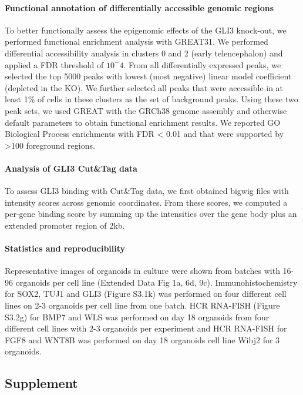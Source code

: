 \paragraph{Functional annotation of differentially accessible genomic regions}
To better functionally assess the epigenomic effects of the GLI3 knock-out, we performed functional enrichment analysis with GREAT31. We performed differential accessibility analysis in clusters 0 and 2 (early telencephalon) and applied a FDR threshold of $10^-4$. From all differentially expressed peaks, we selected the top 5000 peaks with lowest (most negative) linear model coefficient (depleted in the KO). We further selected all peaks that were accessible in at least 1\% of cells in these clusters as the set of background peaks. Using these two peak sets, we used GREAT with the GRCh38 genome assembly and otherwise default parameters to obtain functional enrichment results. We reported GO Biological Process enrichments with FDR < 0.01 and that were supported by >100 foreground regions.
 
\paragraph{Analysis of GLI3 Cut\&Tag data}
To assess GLI3 binding with Cut\&Tag data, we first obtained bigwig files with intensity scores across genomic coordinates. From these scores, we computed a per-gene binding score by summing up the intensities over the gene body plus an extended promoter region of 2kb.
 
\paragraph{Statistics and reproducibility}
Representative images of organoids in culture were shown from batches with 16-96 organoids per cell line (Extended Data Fig 1a, 6d, 9c). Immunohistochemistry for SOX2, TUJ1 and GLI3 (Figure S3.1k) was performed on four different cell lines on 2-3 organoids per cell line from one batch. HCR RNA-FISH (Figure S3.2g) for BMP7 and WLS was performed on day 18 organoids from four different cell lines with 2-3 organoids per experiment and HCR RNA-FISH for FGF8 and WNT8B was performed on day 18 organoids cell line Wibj2 for 3 organoids.

\clearpage

\subsection{Supplement}
\beginsupplement


